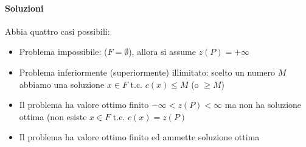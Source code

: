 \documentclass[a4paper,12pt]{article}
\begin{document}
\paragraph{Soluzioni}
Abbia quattro casi possibili:
\begin{itemize}
  \item Problema impossibile: ($F = \emptyset$), allora si assume $z(P) = + \infty$
  \item Problema inferiormente (superiormente) illimitato: scelto un numero $M$ abbiamo una soluzione $x \in F$ t.c. $c(x) \leq M$ (o $\geq M$)
  \item Il problema ha valore ottimo finito $- \infty < z(P) < \infty$ ma non ha soluzione ottima (non esiste $x \in F$ t.c. $c(x)=z(P)$
  \item Il problema ha valore ottimo finito ed ammette soluzione ottima
\end{itemize}
\end{document}
